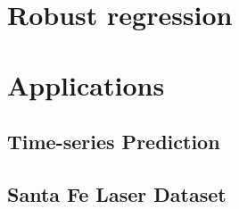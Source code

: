 \documentclass[11pt, a4paper]{article}
\begin{document}
\section{Robust regression}

\section{Applications}

\subsection{Time-series Prediction}

\subsection{Santa Fe Laser Dataset}

 
\end{document}
